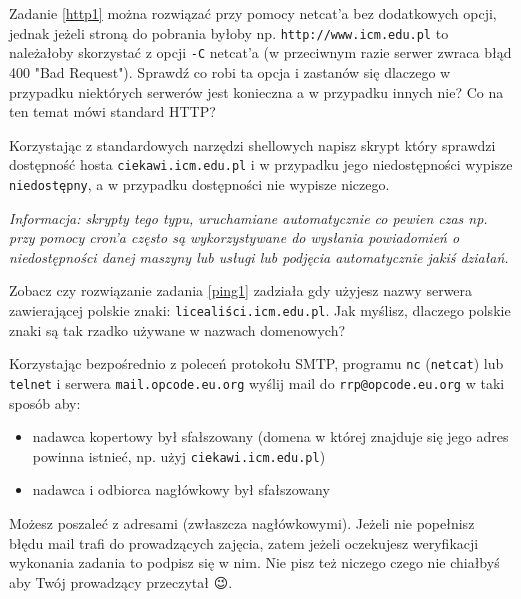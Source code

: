 \dbEntryCheckResults
Zadanie \ref{http1} można rozwiązać przy pomocy netcat'a bez dodatkowych opcji, jednak jeżeli stroną do pobrania byłoby np. \Verb#http://www.icm.edu.pl# to należałoby skorzystać z opcji \Verb#-C# netcat'a (w przeciwnym razie serwer zwraca błąd 400 "Bad Request").
Sprawdź co robi ta opcja i zastanów się dlaczego w przypadku niektórych serwerów jest konieczna a w przypadku innych nie? Co na ten temat mówi standard HTTP?
\fi


\dbEntryCheckResults
Korzystając z standardowych narzędzi shellowych napisz skrypt który sprawdzi dostępność hosta \Verb#ciekawi.icm.edu.pl# i w przypadku jego niedostępności wypisze \Verb#niedostępny#, a w przypadku dostępności nie wypisze niczego.

\textit{Informacja: skrypty tego typu, uruchamiane automatycznie co pewien czas np. przy pomocy cron'a często są wykorzystywane do wysłania powiadomień o niedostępności danej maszyny lub usługi lub podjęcia automatycznie jakiś działań.}
\fi

\dbEntryCheckResults
Zobacz czy rozwiązanie zadania \ref{ping1} zadziała gdy użyjesz nazwy serwera zawierającej polskie znaki: \Verb#licealiści.icm.edu.pl#.
Jak myślisz, dlaczego polskie znaki są tak rzadko używane w nazwach domenowych?
\fi

\dbEntryCheckResults
Korzystając bezpośrednio z poleceń protokołu SMTP, programu \Verb#nc# (\Verb#netcat#) lub \Verb#telnet# i serwera \Verb#mail.opcode.eu.org# wyślij mail do \Verb#rrp@opcode.eu.org# w taki sposób aby:
\begin{itemize}
\item nadawca kopertowy był sfałszowany (domena w której znajduje się jego adres powinna istnieć, np. użyj \Verb#ciekawi.icm.edu.pl#)
\item nadawca i odbiorca nagłówkowy był sfałszowany
\end{itemize}
Możesz poszaleć z adresami (zwłaszcza nagłówkowymi).
Jeżeli nie popełnisz błędu mail trafi do prowadzących zajęcia, zatem jeżeli oczekujesz weryfikacji wykonania zadania to podpisz się w nim.
Nie pisz też niczego czego nie chiałbyś aby Twój prowadzący przeczytał {\Symbola 😉}.
\fi

